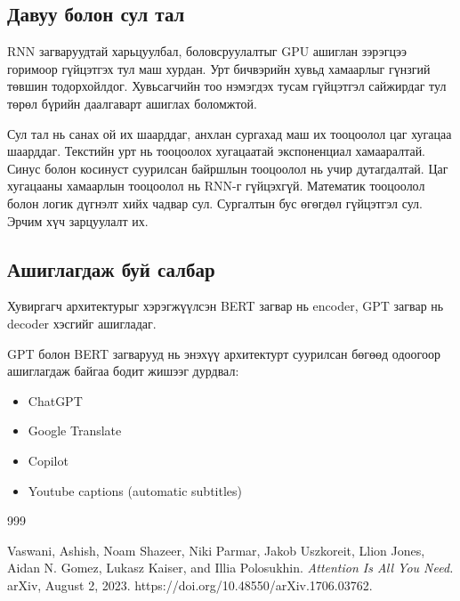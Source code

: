 \documentclass[11pt,a4paper]{article}
\begin{document}
\subsection{Давуу болон сул тал}
\label{sec:org87c0adb}

RNN загваруудтай харьцуулбал, боловсруулалтыг GPU ашиглан зэрэгцээ горимоор гүйцэтгэх тул маш хурдан. Урт бичвэрийн хувьд хамаарлыг гүнзгий төвшин тодорхойлдог. Хувьсагчийн тоо нэмэгдэх тусам гүйцэтгэл сайжирдаг тул төрөл бүрийн даалгаварт ашиглах боломжтой.

Сул тал нь санах ой их шаарддаг, анхлан сургахад маш их тооцоолол цаг хугацаа шаарддаг. Текстийн урт нь тооцоолох хугацаатай экспоненциал хамааралтай. Синус болон косинуст суурилсан байршлын тооцоолол нь учир дутагдалтай. Цаг хугацааны хамаарлын тооцоолол нь RNN-г гүйцэхгүй. Математик тооцоолол болон логик дүгнэлт хийх чадвар сул. Сургалтын бус өгөгдөл гүйцэтгэл сул. Эрчим хүч зарцуулалт их.
\subsection{Ашиглагдаж буй салбар}
\label{sec:org9444732}

Хувиргагч архитектурыг хэрэгжүүлсэн BERT загвар нь encoder, GPT загвар нь decoder хэсгийг ашигладаг.

GPT болон BERT загварууд нь энэхүү архитектурт суурилсан бөгөөд одоогоор ашиглагдаж байгаа бодит жишээг дурдвал:
\begin{itemize}
\item ChatGPT
\item Google Translate
\item Copilot
\item Youtube captions (automatic subtitles)
\end{itemize}

\begin{thebibliography}{999}

  Vaswani, Ashish, Noam Shazeer, Niki Parmar, Jakob Uszkoreit, Llion Jones, Aidan N. Gomez, Lukasz Kaiser, and Illia Polosukhin. \emph{Attention Is All You Need.} arXiv, August 2, 2023. https://doi.org/10.48550/arXiv.1706.03762.
\end{thebibliography}
\end{document}
